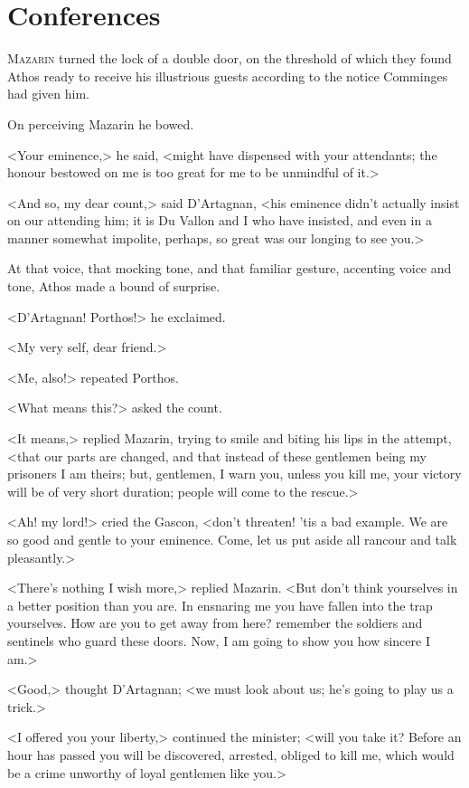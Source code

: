 \chapter{Conferences}

 \lettrine{M}{azarin} turned the lock of a double door, on the threshold of which they found Athos ready to receive his illustrious guests according to the notice Comminges had given him.

\zz
On perceiving Mazarin he bowed.

\zz
<Your eminence,> he said, <might have dispensed with your attendants; the honour bestowed on me is too great for me to be unmindful of it.>

<And so, my dear count,> said D'Artagnan, <his eminence didn't actually insist on our attending him; it is Du Vallon and I who have insisted, and even in a manner somewhat impolite, perhaps, so great was our longing to see you.>

At that voice, that mocking tone, and that familiar gesture, accenting voice and tone, Athos made a bound of surprise.

<D'Artagnan! Porthos!> he exclaimed.

<My very self, dear friend.>

<Me, also!> repeated Porthos.

<What means this?> asked the count.

<It means,> replied Mazarin, trying to smile and biting his lips in the attempt, <that our parts are changed, and that instead of these gentlemen being my prisoners I am theirs; but, gentlemen, I warn you, unless you kill me, your victory will be of very short duration; people will come to the rescue.>

<Ah! my lord!> cried the Gascon, <don't threaten! 'tis a bad example. We are so good and gentle to your eminence. Come, let us put aside all rancour and talk pleasantly.>

<There's nothing I wish more,> replied Mazarin. <But don't think yourselves in a better position than you are. In ensnaring me you have fallen into the trap yourselves. How are you to get away from here? remember the soldiers and sentinels who guard these doors. Now, I am going to show you how sincere I am.>

<Good,> thought D'Artagnan; <we must look about us; he's going to play us a trick.>

<I offered you your liberty,> continued the minister; <will you take it? Before an hour has passed you will be discovered, arrested, obliged to kill me, which would be a crime unworthy of loyal gentlemen like you.>


